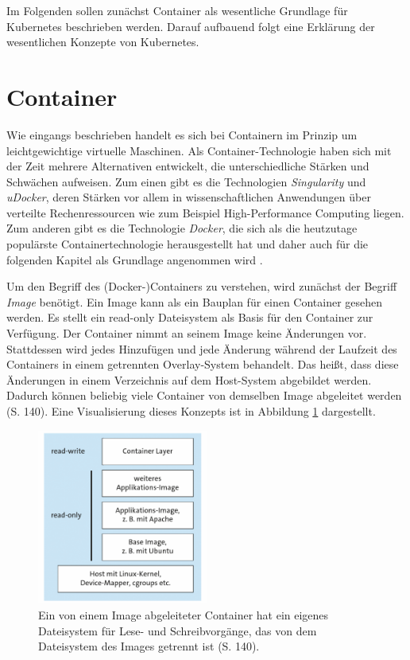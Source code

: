 \documentclass[11pt,a4paper]{article}
\begin{document}
Im Folgenden sollen zunächst Container als wesentliche Grundlage für Kubernetes
beschrieben werden.
Darauf aufbauend folgt eine Erklärung der wesentlichen Konzepte von Kubernetes.

\section{Container}
\label{sec:Container}
Wie eingangs beschrieben handelt es sich bei Containern im Prinzip um leichtgewichtige virtuelle Maschinen.
Als Container-Technologie haben sich mit der Zeit mehrere Alternativen entwickelt, die unterschiedliche
Stärken und Schwächen aufweisen. Zum einen gibt es die Technologien \emph{Singularity} und \emph{uDocker}, deren Stärken
vor allem in wissenschaftlichen Anwendungen über verteilte Rechenressourcen wie zum Beispiel High-Performance Computing
liegen. Zum anderen gibt es die Technologie \emph{Docker}, die sich als die heutzutage populärste Containertechnologie
herausgestellt hat und daher auch für die folgenden Kapitel als Grundlage angenommen wird \cite{Bentaleb_Belloum_Sebaa_El-Maouhab_2021}.

Um den Begriff des (Docker-)Containers zu verstehen, wird zunächst der Begriff \emph{Image} benötigt.
Ein Image kann als ein Bauplan für einen Container gesehen werden.
Es stellt ein read-only Dateisystem als Basis für den Container zur Verfügung. Der Container nimmt an seinem Image
keine Änderungen vor. Stattdessen wird jedes Hinzufügen und jede Änderung während der Laufzeit des Containers in einem
getrennten Overlay-System behandelt.
Das heißt, dass diese Änderungen in einem Verzeichnis auf dem Host-System abgebildet werden.
Dadurch können beliebig viele Container von demselben Image abgeleitet werden \cite{kofler2021docker} (S. 140).
Eine Visualisierung dieses Konzepts ist in Abbildung \ref{fig:overlay} dargestellt.

\begin{figure}[h]
  \centering
  \includegraphics[width=0.5\textwidth]{./media/kofler2021docker S.140.png}
  \caption{Ein von einem Image abgeleiteter Container hat ein eigenes Dateisystem für Lese- und Schreibvorgänge, das
    von dem Dateisystem des Images getrennt ist \cite{kofler2021docker} (S. 140).}
  \label{fig:overlay}
\end{figure}
\end{document}
